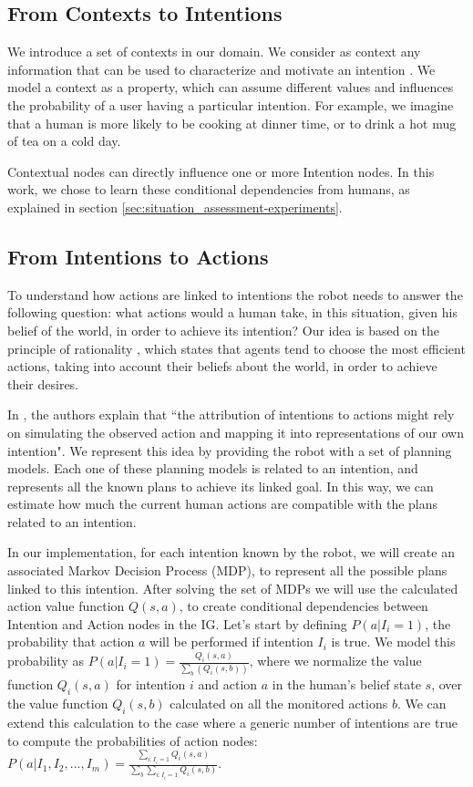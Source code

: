 \subsection{From Contexts to Intentions}
We introduce a set of contexts in our domain. We consider as context any information that can be used to characterize and motivate an intention \cite{abowd1999towards}. We model a context  as a property, which can assume different values and influences the probability of a user having a particular intention. For example, we imagine that a human is more likely to be cooking at dinner time, or to drink a hot mug of tea on a cold day.

Contextual nodes can directly influence one or more Intention nodes. In this work, we chose to learn these conditional dependencies from humans, as explained in section \ref{sec:situation_assessment-experiments}.

\subsection{From Intentions to Actions}
\label{sec:situation_assessment-action_evaluation}
To understand how actions are linked to intentions the robot needs to answer the following question: what actions would a human take, in this situation, given his belief of the world, in order to achieve its intention?
Our idea is based on the principle of rationality \cite{Dennet1989}, which states that agents tend to choose the most efficient actions, taking into account their beliefs about the world, in order to achieve their desires.

In \cite{Blakemore2001}, the authors explain that ``the attribution of intentions to actions might rely on simulating the observed action and mapping it into representations of our own intention". We represent this idea by providing the robot with a set of planning models. Each one of these planning models is related to an intention, and represents all the known plans to achieve its linked goal. In this way, we can estimate how much the current human actions are compatible with the plans related to an intention.

In our implementation, for each intention known by the robot, we will create an associated Markov Decision Process (MDP), to represent all the possible plans linked to this intention. After solving the set of MDPs we will use the calculated action value function \(Q(s,a)\), to create conditional dependencies between Intention and Action nodes in the IG. Let's start by defining \(P(a|I_i=1)\), the probability that action $a$ will be performed if intention $I_i$ is true. We model this probability as \(P(a|I_i=1)=\frac{Q_i(s,a)}{\sum_b(Q_i(s,b))}\), where we normalize the value function $Q_i(s,a)$ for intention $i$ and action $a$ in the human's belief state $s$, over the value function $Q_i(s,b)$ calculated on all the monitored actions $b$. We can extend this calculation to the case where a generic number of intentions are true to compute the probabilities of action nodes: \(P(a|I_1,I_2,...,I_m)=\frac{\sum_{i:I_i=1}Q_i(s,a)}{\sum_b\sum_{i:I_i=1}Q_i(s,b)}\).


